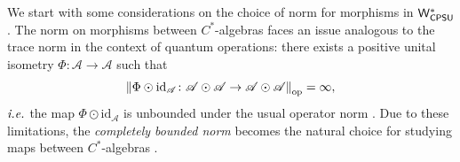 \begin{comment}
In other words, the map $\phi^* : \mathcal{B}(\mathcal{K}) \to \mathcal{B}(\mathcal{H})$ can be defined as
\[
\phi^*(A) = \sum_{i,j} \operatorname{tr}\left(A \cdot \phi(\ket{j}\bra{i})\right) \cdot \ket{i}\bra{j},
\]
where \( i \) and \( j \) range over an orthonormal basis of \( \mathcal{H} \). 


\vspace{10pt}

\%subsubsection{$\WstarCPSUop$ forms a first-oder model}

\end{comment}


We start with some considerations on the choice of norm for morphisms in $\mathsf{W^*_{CPSU}}$. The norm on morphisms between $C^*$-algebras
faces  an issue analogous to the trace norm in the context of quantum operations:  there exists a positive unital isometry \( \Phi \colon \mathscr{A} \to \mathscr{A} \) such that 
\[
\left\lVert \Phi \odot \mathrm{id}_\mathscr{A} \colon \mathscr{A} \odot \mathscr{A} \to \mathscr{A} \odot \mathscr{A} \right\rVert_{\text{op}} = \infty,
\]
$\emph{i.e.}$ the map $\Phi \odot \mathrm{id}_{\mathscr{A}}$ is unbounded under the usual operator norm 
\cite[Prop.~3.5.2]{brownCalgebrasFinitedimensionalApproximations}. Due to these limitations, the \emph{completely bounded norm} becomes the natural choice for studying maps between $C^*$-algebras \cite{effrosOperatorSpaces2000,paulsenCompletelyBoundedMaps2003}. 

